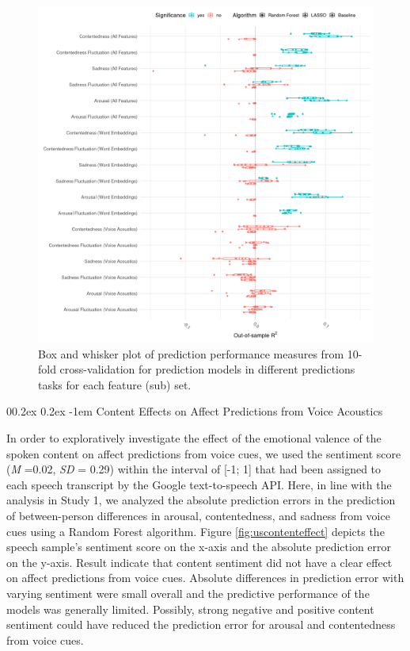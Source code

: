 \documentclass[
  man,floatsintext]{apa6}
\makeatletter
\let\oldparagraph\paragraph
\renewcommand{\paragraph}[1]{\oldparagraph{#1}\mbox{}}
\renewcommand{\paragraph}{\@startsection{paragraph}{4}{\parindent}%
  {0\baselineskip \@plus 0.2ex \@minus 0.2ex}%
  {-1em}%
  {\normalfont\normalsize\bfseries\itshape\typesectitle}}
\makeatother
\begin{document}
\begin{figure}

{\centering \includegraphics[width=1\linewidth,height=0.9\textheight]{../figures/bmr_us_egemaps_wordembeddings_plot} 

}

\caption[Prediction performance Study 2]{Box and whisker plot of prediction performance measures from 10-fold cross-validation for prediction models in different predictions tasks for each feature (sub) set.}\label{fig:uspredictionoverview}
\end{figure}

\hypertarget{content-effects-on-affect-predictions-from-voice-acoustics-1}{%
\paragraph{Content Effects on Affect Predictions from Voice Acoustics}\label{content-effects-on-affect-predictions-from-voice-acoustics-1}}

In order to exploratively investigate the effect of the emotional valence of the spoken content on affect predictions from voice cues, we used the sentiment score (\emph{M} =0.02, \emph{SD} = 0.29) within the interval of {[}-1; 1{]} that had been assigned to each speech transcript by the Google text-to-speech API. Here, in line with the analysis in Study 1, we analyzed the absolute prediction errors in the prediction of between-person differences in arousal, contentedness, and sadness from voice cues using a Random Forest algorithm. Figure \ref{fig:uscontenteffect} depicts the speech sample's sentiment score on the x-axis and the absolute prediction error on the y-axis.
Result indicate that content sentiment did not have a clear effect on affect predictions from voice cues. Absolute differences in prediction error with varying sentiment were small overall and the predictive performance of the models was generally limited. Possibly, strong negative and positive content sentiment could have reduced the prediction error for arousal and contentedness from voice cues.
\end{document}
